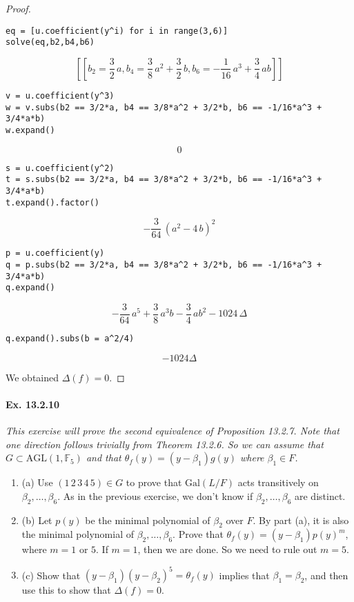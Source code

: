 \documentclass[11pt,a4paper]{article}
\newcommand{\be} {\begin{enumerate}}
\newcommand{\ee} {\end{enumerate}}
\newcommand{\F}{\mathbb{F}}
\newcommand{\Gal}{\mathrm{Gal}}
\begin{document}
\begin{proof}
\begin{verbatim}
eq = [u.coefficient(y^i) for i in range(3,6)]
solve(eq,b2,b4,b6)
\end{verbatim}

$$\left[\left[b_{2} = \frac{3}{2} \, a, b_{4} = \frac{3}{8} \, a^{2} +
\frac{3}{2} \, b, b_{6} = -\frac{1}{16} \, a^{3} + \frac{3}{4} \, a
b\right]\right]$$

\begin{verbatim}
v = u.coefficient(y^3)
w = v.subs(b2 == 3/2*a, b4 == 3/8*a^2 + 3/2*b, b6 == -1/16*a^3 + 3/4*a*b)
w.expand()
\end{verbatim}
$$0$$
\begin{verbatim}
s = u.coefficient(y^2)
t = s.subs(b2 == 3/2*a, b4 == 3/8*a^2 + 3/2*b, b6 == -1/16*a^3 + 3/4*a*b)
t.expand().factor()
\end{verbatim}
$$-\frac{3}{64} \, {\left(a^{2} - 4 \, b\right)}^{2}$$

\begin{verbatim}
p = u.coefficient(y)
q = p.subs(b2 == 3/2*a, b4 == 3/8*a^2 + 3/2*b, b6 == -1/16*a^3 + 3/4*a*b)
q.expand()
\end{verbatim}
$$-\frac{3}{64} \, a^{5} + \frac{3}{8} \, a^{3} b - \frac{3}{4} \, a b^{2}
- 1024 \, \Delta$$
\begin{verbatim}
q.expand().subs(b = a^2/4)
\end{verbatim}
$$-1024 \Delta$$

We obtained $\Delta(f) = 0$.
\end{proof}

\paragraph{Ex. 13.2.10}

{\it This exercise will prove the second equivalence of Proposition 13.2.7. Note that one direction follows trivially from Theorem 13.2.6. So we can assume that $G \subset \mathrm{AGL}(1,\F_5)$ and that $\theta_f(y) = (y-\beta_1) g(y)$ where $\beta_1 \in F$.
\be
\item[(a)] Use $(1\,2\,3\,4\,5) \in G$ to prove that $\Gal(L/F)$ acts transitively on $\beta_2,\ldots,\beta_6$. As in the previous exercise, we don't know if $\beta_2,\ldots,\beta_6$ are distinct.

\item[(b)] Let $p(y)$ be the minimal polynomial of $\beta_2$ over $F$. By part (a), it is also the minimal polynomial of $\beta_2,\ldots,\beta_6$. Prove that $\theta_f(y) = (y-\beta_1)p(y)^m$, where $m=1$ or $5$. If $m=1$, then we are done. So we need to rule out $m=5$.

\item[(c)] Show that $(y-\beta_1)(y-\beta_2)^5 = \theta_f(y)$ implies that $\beta_1 = \beta_2$, and then use this to show that $\Delta(f) = 0$.
\ee
}
\end{document}
